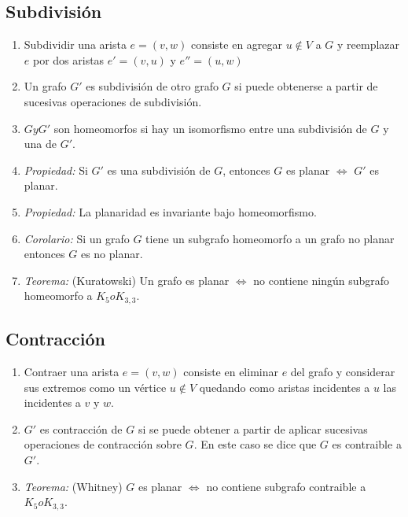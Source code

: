 \subsection{Subdivisión}
\begin{enumerate}
\item Subdividir una arista $e=(v,w)$ consiste en agregar $u \notin V$ a $G$ y reemplazar $e$ por dos aristas $e'=(v,u)$ y $e''=(u,w)$
\item Un grafo $G'$ es subdivisión de otro grafo $G$ si puede obtenerse a partir de sucesivas operaciones de subdivisión.
\item $G y G'$ son homeomorfos si hay un isomorfismo entre una subdivisión de $G$ y una de $G'$.
\item \textit{Propiedad:} Si $G'$ es una subdivisión de $G$, entonces $G$ es planar $\iff$ $G'$ es planar.
\item \textit{Propiedad:} La planaridad es invariante bajo homeomorfismo.
\item \textit{Corolario:} Si un grafo $G$ tiene un subgrafo homeomorfo a un grafo no planar entonces $G$ es no planar.
\item \textit{Teorema:} (Kuratowski) Un grafo es planar $\iff$ no contiene ningún subgrafo homeomorfo a $K_{5} o K_{3,3}$.
\end{enumerate}

\subsection{Contracción}
\begin{enumerate}
\item Contraer una arista $e=(v,w)$ consiste en eliminar $e$ del grafo y considerar sus extremos como un vértice $u \notin V$ quedando como aristas incidentes a $u$ las incidentes a $v$ y $w$.
\item $G'$ es contracción de $G$ si se puede obtener a partir de aplicar sucesivas operaciones de contracción sobre $G$. En este caso se dice que $G$ es contraible a $G'$.
\item \textit{Teorema:} (Whitney) $G$ es planar $\iff$ no contiene subgrafo contraible a $K_{5} o K_{3,3}$.
\end{enumerate}

